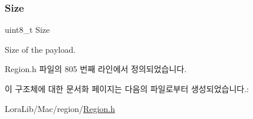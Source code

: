 \mbox{\label{structs_apply_c_f_list_params_ace31de7598e85e87624c4e7d8e5d112c}} 
\subsubsection{\texorpdfstring{Size}{Size}}
{\footnotesize\ttfamily uint8\+\_\+t Size}

Size of the payload. 

Region.\+h 파일의 805 번째 라인에서 정의되었습니다.



이 구조체에 대한 문서화 페이지는 다음의 파일로부터 생성되었습니다.\+:\begin{DoxyCompactItemize}
\item 
Lora\+Lib/\+Mac/region/\mbox{\hyperlink{_region_8h}{Region.\+h}}\end{DoxyCompactItemize}
